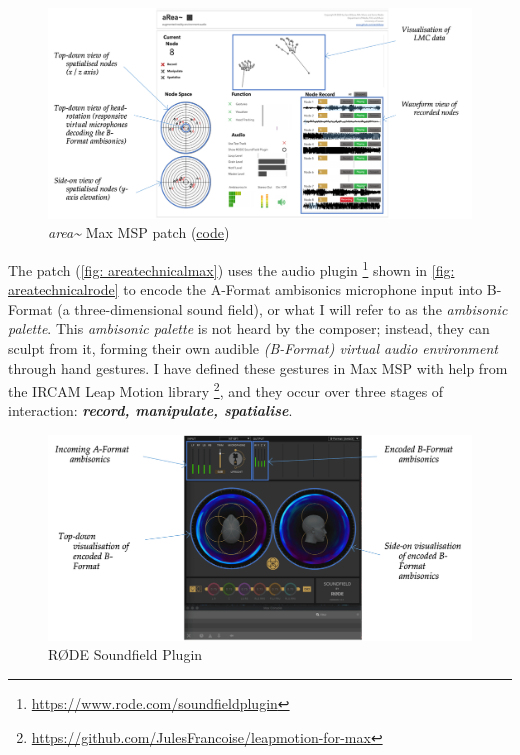 \begin{figure}
    \centering
    \includegraphics[angle=90,height=0.95\textheight]{figures/05-area/areatechnical_max.png}
    \caption{\textit{area\textasciitilde{}} Max MSP patch (\href{https://github.com/sambilbow/area/tree/main/maxmsp}{code})}
    \label{fig: areatechnicalmax}
\end{figure}
The patch (\autoref{fig: areatechnicalmax}) uses the audio plugin \footnote{\url{https://www.rode.com/soundfieldplugin}} shown in \autoref{fig: areatechnicalrode} to encode the A-Format ambisonics microphone input into B-Format (a three-dimensional sound field), or what I will refer to as the \textit{ambisonic palette}. This \textit{ambisonic palette} is not heard by the composer; instead, they can sculpt from it, forming their own audible \textit{(B-Format) virtual audio environment} through hand gestures. I have defined these gestures in Max MSP with help from the IRCAM Leap Motion library \citeyearpar{ircam2014} \footnote{\url{https://github.com/JulesFrancoise/leapmotion-for-max}}, and they occur over three stages of interaction: \textit{\textbf{record, manipulate, spatialise}}. 

\begin{figure}
    \centering
    \includegraphics[angle=90,height=0.75\textheight]{figures/05-area/areatechnical_rode.png}
    \caption{RØDE Soundfield Plugin}
    \label{fig: areatechnicalrode}
\end{figure}

